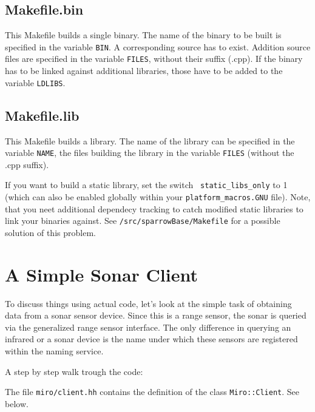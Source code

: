 \subsection{Makefile.bin}

This Makefile builds a single binary. The name of the binary to be
built is specified in the variable {\tt BIN}. A corresponding
source has to exist. Addition source files are specified in the
variable {\tt FILES}, without their suffix (.cpp). If the binary has
to be linked against additional libraries, those have to be added to the
variable {\tt LDLIBS}.


\subsection{Makefile.lib}

This Makefile builds a library. The name of the library can be
specified in the variable {\tt NAME}, the files building the
library in the variable {\tt FILES} (without the .cpp suffix).

If you want to build a static library, set the switch {\tt
  static\_libs\_only} to 1 (which can also be enabled globally within
your \texttt{platform\_macros.GNU} file). Note, that you neet
additional dependecy tracking to catch modified static libraries to
link your binaries against. See \texttt{/src/sparrowBase/Makefile} for
a possible solution of this problem.

\section{A Simple Sonar Client}

To discuss things using actual code, let's look at the simple task of
obtaining data from a sonar sensor device. Since this is a range
sensor, the sonar is queried via the generalized range sensor
interface. The only difference in querying an infrared or a sonar
device is the name under which these sensors are registered within the
naming service.



A step by step walk trough the code:



The file \lstinline!miro/client.hh! contains the definition of the class
\lstinline!Miro::Client!. See below.



